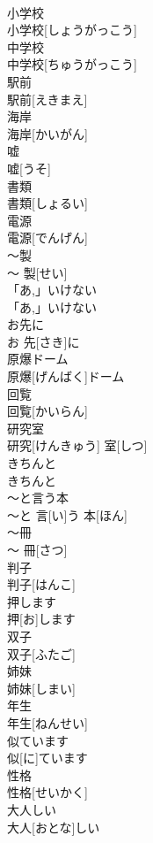 \documentclass[8pt]{extreport}
\begin{document}
\begin{CJK}{UTF8}{min}
\\	小学校	
\\	小学校[しょうがっこう]	
\\	中学校	
\\	中学校[ちゅうがっこう]	
\\	駅前	
\\	駅前[えきまえ]	
\\	海岸	
\\	海岸[かいがん]	
\\	嘘	
\\	嘘[うそ]	
\\	書類	
\\	書類[しょるい]	
\\	電源	
\\	電源[でんげん]	
\\	〜製	
\\	〜 製[せい]	
\\	「あ,」いけない	
\\	「あ,」いけない	
\\	お先に	
\\	お 先[さき]に	
\\	原爆ドーム	
\\	原爆[げんばく]ドーム	
\\	回覧	
\\	回覧[かいらん]	
\\	研究室	
\\	研究[けんきゅう] 室[しつ]	
\\	きちんと	
\\	きちんと	
\\	〜と言う本	
\\	〜と 言[い]う 本[ほん]	
\\	〜冊	
\\	〜 冊[さつ]	
\\	判子	
\\	判子[はんこ]	
\\	押します 
\\	押[お]します 
\\	双子	
\\	双子[ふたご]	
\\	姉妹	
\\	姉妹[しまい]	
\\	年生	
\\	年生[ねんせい]	
\\	似ています	
\\	似[に]ています	
\\	性格	
\\	性格[せいかく]	
\\	大人しい	
\\	大人[おとな]しい	

\end{CJK}
\end{document}
